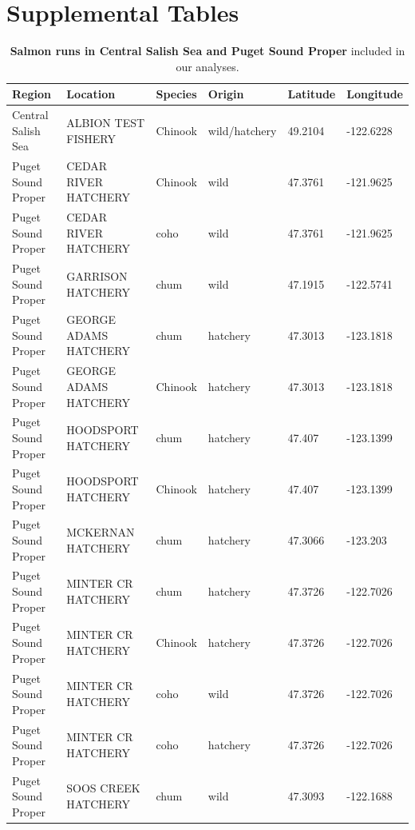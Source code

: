 \documentclass{article}
\begin{document}
\section* {Supplemental Tables}
\begin{table}[ht]
\centering
\caption{\textbf{Salmon runs in Central Salish Sea and Puget Sound Proper} included in our analyses.} 
\label{tab:salmon}
\begingroup\footnotesize
\begin{tabular}{|p{}|p{}|p{}|p{}|p{}|p{}|}
  \hline
Region & Location & Species & Origin & Latitude & Longitude \\ 
  \hline
Central Salish Sea & ALBION TEST FISHERY & Chinook & wild/hatchery & 49.2104 & -122.6228 \\ 
   \hline
Puget Sound Proper & CEDAR RIVER HATCHERY & Chinook & wild & 47.3761 & -121.9625 \\ 
  Puget Sound Proper & CEDAR RIVER HATCHERY & coho & wild & 47.3761 & -121.9625 \\ 
  Puget Sound Proper & GARRISON HATCHERY & chum & wild & 47.1915 & -122.5741 \\ 
  Puget Sound Proper & GEORGE ADAMS HATCHERY & chum & hatchery & 47.3013 & -123.1818 \\ 
  Puget Sound Proper & GEORGE ADAMS HATCHERY & Chinook & hatchery & 47.3013 & -123.1818 \\ 
  Puget Sound Proper & HOODSPORT HATCHERY & chum & hatchery & 47.407 & -123.1399 \\ 
  Puget Sound Proper & HOODSPORT HATCHERY & Chinook & hatchery & 47.407 & -123.1399 \\ 
  Puget Sound Proper & MCKERNAN HATCHERY & chum & hatchery & 47.3066 & -123.203 \\ 
  Puget Sound Proper & MINTER CR HATCHERY & chum & hatchery & 47.3726 & -122.7026 \\ 
  Puget Sound Proper & MINTER CR HATCHERY & Chinook & hatchery & 47.3726 & -122.7026 \\ 
  Puget Sound Proper & MINTER CR HATCHERY & coho & wild & 47.3726 & -122.7026 \\ 
  Puget Sound Proper & MINTER CR HATCHERY & coho & hatchery & 47.3726 & -122.7026 \\ 
  Puget Sound Proper & SOOS CREEK HATCHERY & chum & wild & 47.3093 & -122.1688 \\ 
   \hline
\end{tabular}
\endgroup
\end{table}
\end{document}
